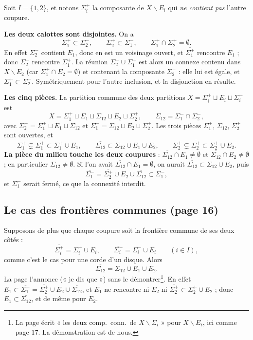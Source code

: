 \documentclass[11pt,a4paper]{article}
\begin{document}
Soit $I = \{1, 2\}$, et notons $\Sigma_i^{+}$ la composante de $X
\smallsetminus E_i$ qui \emph{ne contient pas} l'autre coupure.

\textbf{Les deux calottes sont disjointes.} On a
\[
\Sigma_1^{+} \subset \Sigma_2^{-}, \qquad \Sigma_2^{+} \subset \Sigma_1^{-},
\qquad \Sigma_1^{+} \cap \Sigma_2^{+} = \emptyset .
\]
En effet $\Sigma_2^{-}$ contient $E_1$, donc en est un voisinage ouvert, et
$\overline{\Sigma_1^{+}}$ rencontre $E_1$ ; donc $\Sigma_2^{-}$ rencontre
$\Sigma_1^{+}$. La réunion $\Sigma_2^{-} \cup \Sigma_1^{+}$ est alors un
connexe contenu dans $X \smallsetminus E_2$ (car $\Sigma_1^{+} \cap E_2 =
\emptyset$) et contenant la composante $\Sigma_2^{-}$ : elle lui est égale,
et $\Sigma_1^{+} \subset \Sigma_2^{-}$. Symétriquement pour l'autre
inclusion, et la disjonction en résulte.

\textbf{Les cinq pièces.} La partition commune des deux partitions $X =
\Sigma_i^{+} \sqcup E_i \sqcup \Sigma_i^{-}$ est
\[
X = \Sigma_1^{+} \sqcup E_1 \sqcup \Sigma_{12} \sqcup E_2 \sqcup
\Sigma_2^{+}, \qquad \Sigma_{12} = \Sigma_1^{-} \cap \Sigma_2^{-},
\]
avec $\Sigma_2^{-} = \Sigma_1^{+} \sqcup E_1 \sqcup \Sigma_{12}$ et
$\Sigma_1^{-} = \Sigma_{12} \sqcup E_2 \sqcup \Sigma_2^{+}$. Les trois pièces
$\Sigma_1^{+}$, $\Sigma_{12}$, $\Sigma_2^{+}$ sont ouvertes, et
\[
\Sigma_1^{+} \subsetneq \overline{\Sigma_1^{+}} \subset \Sigma_1^{+} \cup
E_1, \qquad \overline{\Sigma_{12}} \subset \Sigma_{12} \cup E_1 \cup E_2,
\qquad \Sigma_2^{+} \subsetneq \overline{\Sigma_2^{+}} \subset \Sigma_2^{+}
\cup E_2 .
\]
\textbf{La pièce du milieu touche les deux coupures} :
$\overline{\Sigma_{12}} \cap E_1 \neq \emptyset$ et $\overline{\Sigma_{12}}
\cap E_2 \neq \emptyset$ ; en particulier $\Sigma_{12} \neq \emptyset$. Si
l'on avait $\overline{\Sigma_{12}} \cap E_1 = \emptyset$, on aurait
$\overline{\Sigma_{12}} \subset \Sigma_{12} \cup E_2$, puis
\[
\overline{\Sigma_1^{-}} = \overline{\Sigma_2^{+}} \cup E_2 \cup
\overline{\Sigma_{12}} \subset \Sigma_1^{-},
\]
et $\Sigma_1^{-}$ serait fermé, ce que la connexité interdit.

\subsection*{Le cas des frontières communes (page 16)}

Supposons de plus que chaque coupure soit la frontière commune de ses deux
côtés :
\[
\overline{\Sigma_i^{+}} = \Sigma_i^{+} \cup E_i, \qquad
\overline{\Sigma_i^{-}} = \Sigma_i^{-} \cup E_i \qquad (i \in I),
\]
comme c'est le cas pour une corde d'un disque. Alors
\[
\overline{\Sigma_{12}} = \Sigma_{12} \cup E_1 \cup E_2 .
\]
La page l'annonce (« je dis que ») sans le démontrer\footnote{La page écrit
« les deux comp.\ conn.\ de $X \smallsetminus \Sigma_i$ » pour $X
\smallsetminus E_i$, ici comme page 17. La démonstration est de nous.}. En
effet $E_1 \subset \overline{\Sigma_1^{-}} = \overline{\Sigma_2^{+}} \cup E_2
\cup \overline{\Sigma_{12}}$, et $E_1$ ne rencontre ni $E_2$ ni
$\overline{\Sigma_2^{+}} \subset \Sigma_2^{+} \cup E_2$ ; donc $E_1 \subset
\overline{\Sigma_{12}}$, et de même pour $E_2$.
\end{document}

